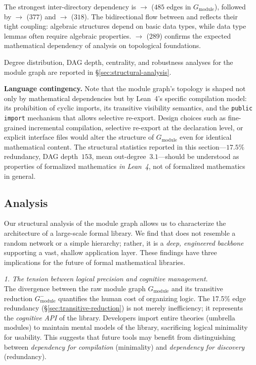 The strongest inter-directory dependency is  $\to$  ($485$ edges in $G_{\mathrm{module}}$), followed by  $\to$  ($377$) and  $\to$  ($318$). The bidirectional flow between  and  reflects their tight coupling: algebraic structures depend on basic data types, while data type lemmas often require algebraic properties.  $\to$  ($289$) confirms the expected mathematical dependency of analysis on topological foundations.

Degree distribution, DAG depth, centrality, and robustness analyses for the module graph are reported in \S\ref{sec:structural-analysis}.

\noindent\textbf{Language contingency.}
\label{rem:language-contingency}
Note that the module graph's topology is shaped not only by mathematical dependencies but by Lean~4's specific compilation model: its prohibition of cyclic imports, its transitive visibility semantics, and the \texttt{public import} mechanism that allows selective re-export. Design choices such as fine-grained incremental compilation, selective re-export at the declaration level, or explicit interface files would alter the structure of $G_{\mathrm{module}}$ even for identical mathematical content. The structural statistics reported in this section---$17.5\%$ redundancy, DAG depth~$153$, mean out-degree~$3.1$---should be understood as properties of formalized mathematics \emph{in Lean~4}, not of formalized mathematics in general.

\subsection{Analysis}
\label{sec:module_conclusion}
Our structural analysis of the  module graph allows us to characterize the architecture of a large-scale formal library. We find that  does not resemble a random network or a simple hierarchy; rather, it is a \textit{deep, engineered backbone} supporting a vast, shallow application layer. These findings have three implications for the future of formal mathematical libraries.

\medskip
\noindent \textit{1. The tension between logical precision and cognitive management.} \\
The divergence between the raw module graph $G_{\mathrm{module}}$ and its transitive reduction $G_{\mathrm{module}}^{-}$ quantifies the human cost of organizing logic. The 17.5\% edge redundancy (\S\ref{sec:transitive-reduction}) is not merely inefficiency; it represents the \textit{cognitive API} of the library. Developers import entire theories (umbrella modules) to maintain mental models of the library, sacrificing logical minimality for usability. This suggests that future tools may benefit from distinguishing between \textit{dependency for compilation} (minimality) and \textit{dependency for discovery} (redundancy).

